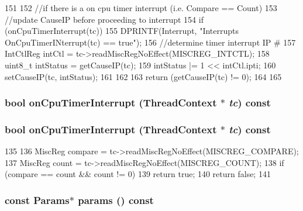 \begin{DoxyCode}
151 {
152     //if there is a on cpu timer interrupt (i.e. Compare == Count)
153     //update CauseIP before proceeding to interrupt
154     if (onCpuTimerInterrupt(tc)) {
155         DPRINTF(Interrupt, "Interrupts OnCpuTimerINterrupt(tc) == true\n");
156         //determine timer interrupt IP #
157         IntCtlReg intCtl = tc->readMiscRegNoEffect(MISCREG_INTCTL);
158         uint8_t intStatus = getCauseIP(tc);
159         intStatus |= 1 << intCtl.ipti;
160         setCauseIP(tc, intStatus);
161     }
162 
163     return (getCauseIP(tc) != 0);
164 
165 }
\end{DoxyCode}
\hypertarget{classMipsISA_1_1Interrupts_a3dfe5717c5a726738b098c9b5c747a44}{
\subsubsection[{onCpuTimerInterrupt}]{\setlength{\rightskip}{0pt plus 5cm}bool onCpuTimerInterrupt ({\bf ThreadContext} $\ast$ {\em tc}) const}}
\label{classMipsISA_1_1Interrupts_a3dfe5717c5a726738b098c9b5c747a44}
\hypertarget{classMipsISA_1_1Interrupts_a3dfe5717c5a726738b098c9b5c747a44}{
\subsubsection[{onCpuTimerInterrupt}]{\setlength{\rightskip}{0pt plus 5cm}bool onCpuTimerInterrupt ({\bf ThreadContext} $\ast$ {\em tc}) const}}
\label{classMipsISA_1_1Interrupts_a3dfe5717c5a726738b098c9b5c747a44}



\begin{DoxyCode}
135 {
136     MiscReg compare = tc->readMiscRegNoEffect(MISCREG_COMPARE);
137     MiscReg count = tc->readMiscRegNoEffect(MISCREG_COUNT);
138     if (compare == count && count != 0)
139         return true;
140     return false;
141 }
\end{DoxyCode}
\hypertarget{classMipsISA_1_1Interrupts_acd3c3feb78ae7a8f88fe0f110a718dff}{
\subsubsection[{params}]{\setlength{\rightskip}{0pt plus 5cm}const {\bf Params}$\ast$ params () const}}
\label{classMipsISA_1_1Interrupts_acd3c3feb78ae7a8f88fe0f110a718dff}



